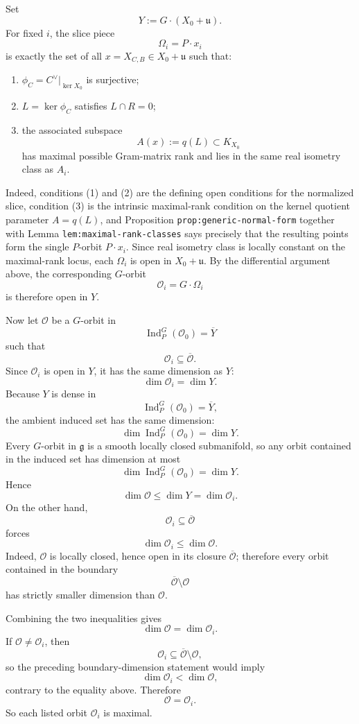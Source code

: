 \documentclass[
  11pt,
]{article}
\providecommand{\tightlist}{%
  \setlength{\itemsep}{0pt}\setlength{\parskip}{0pt}}
\begin{document}
Set \[
Y:=G\cdot(X_0+\mathfrak u).
\] For fixed \(i\), the slice piece \[
\Omega_i=P\cdot x_i
\] is exactly the set of all \(x=X_{C,B}\in X_0+\mathfrak u\) such that:

\begin{enumerate}
\def\labelenumi{\arabic{enumi}.}
\tightlist
\item
  \(\phi_C=C^\vee|_{\ker X_0}\) is surjective;
\item
  \(L=\ker \phi_C\) satisfies \(L\cap R=0\);
\item
  the associated subspace \[
  A(x):=q(L)\subset K_{X_0}
  \] has maximal possible Gram-matrix rank and lies in the same real
  isometry class as \(A_i\).
\end{enumerate}

Indeed, conditions (1) and (2) are the defining open conditions for the
normalized slice, condition (3) is the intrinsic maximal-rank condition
on the kernel quotient parameter \(A=q(L)\), and Proposition
\texttt{prop:generic-normal-form} together with Lemma
\texttt{lem:maximal-rank-classes} says precisely that the resulting
points form the single \(P\)-orbit \(P\cdot x_i\). Since real isometry
class is locally constant on the maximal-rank locus, each \(\Omega_i\)
is open in \(X_0+\mathfrak u\). By the differential argument above, the
corresponding \(G\)-orbit \[
\mathcal O_i=G\cdot \Omega_i
\] is therefore open in \(Y\).

Now let \(\mathcal O\) be a \(G\)-orbit in \[
\operatorname{Ind}_P^G(\mathcal O_0)=\overline Y
\] such that \[
\mathcal O_i\subseteq \overline{\mathcal O}.
\] Since \(\mathcal O_i\) is open in \(Y\), it has the same dimension as
\(Y\): \[
\dim \mathcal O_i=\dim Y.
\] Because \(Y\) is dense in \[
\operatorname{Ind}_P^G(\mathcal O_0)=\overline Y,
\] the ambient induced set has the same dimension: \[
\dim \operatorname{Ind}_P^G(\mathcal O_0)=\dim Y.
\] Every \(G\)-orbit in \(\mathfrak g\) is a smooth locally closed
submanifold, so any orbit contained in the induced set has dimension at
most \[
\dim \operatorname{Ind}_P^G(\mathcal O_0)=\dim Y.
\] Hence \[
\dim \mathcal O\le \dim Y=\dim \mathcal O_i.
\] On the other hand, \[
\mathcal O_i\subseteq \overline{\mathcal O}
\] forces \[
\dim \mathcal O_i\le \dim \mathcal O.
\] Indeed, \(\mathcal O\) is locally closed, hence open in its closure
\(\overline{\mathcal O}\); therefore every orbit contained in the
boundary \[
\overline{\mathcal O}\setminus \mathcal O
\] has strictly smaller dimension than \(\mathcal O\).

Combining the two inequalities gives \[
\dim \mathcal O=\dim \mathcal O_i.
\] If \(\mathcal O\neq \mathcal O_i\), then \[
\mathcal O_i\subseteq \overline{\mathcal O}\setminus \mathcal O,
\] so the preceding boundary-dimension statement would imply \[
\dim \mathcal O_i<\dim \mathcal O,
\] contrary to the equality above. Therefore \[
\mathcal O=\mathcal O_i.
\] So each listed orbit \(\mathcal O_i\) is maximal.
\end{document}
